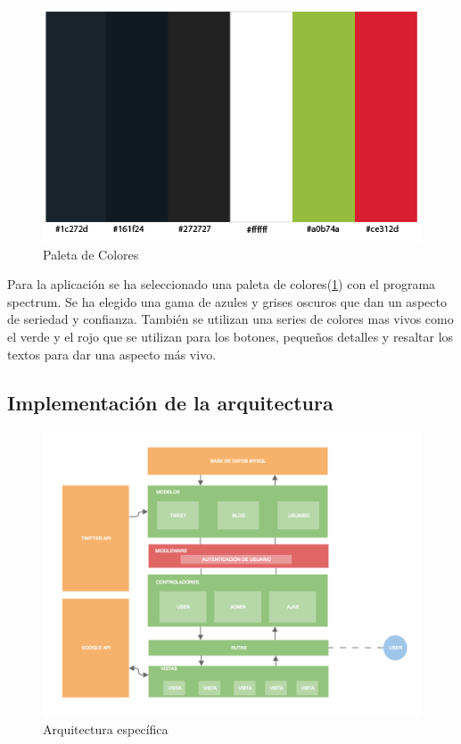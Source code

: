 \begin{figure}
\begin{center}
\includegraphics[width=1.0\textwidth]{imagenes/paleta.png}
\caption{Paleta de Colores}
\label{paleta}
\end{center}
\end{figure}

Para la aplicación se ha seleccionado una paleta de colores(\ref{paleta}) con el programa spectrum. Se ha elegido una gama de azules y grises oscuros que dan un aspecto de seriedad y confianza. También se utilizan una series de colores mas vivos como el verde y el rojo que se utilizan para los botones, pequeños detalles y resaltar los textos para dar una aspecto más vivo.


\subsection{Implementación de la arquitectura}

\begin{figure}
\begin{center}
\includegraphics[width=1.0\textwidth]{imagenes/implementacion-arquitectura.png}
\caption{Arquitectura específica}
\label{implement-arch}
\end{center}
\end{figure}

